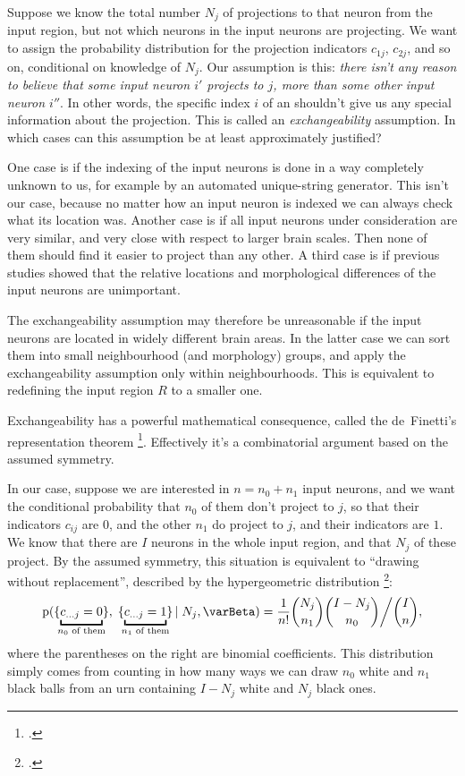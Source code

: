 \documentclass[\ifafour a4paper,12pt,\else a5paper,10pt,\fi%
onecolumn,oneside,article,%
british%
]{memoir}
\theoremstyle{remark}
\theoremstyle{innote}
\newcommand*{\citep}{\footcites}
\newcommand*{\pf}{\mathrm{p}}%
\renewcommand*{\|}[1][]{\nonscript\,#1\vert\nonscript\;\mathopen{}}
\newcommand*{\chap}{ch.}%
\newcommand*{\yI}{\varBeta}
\DeclarePairedDelimiter\tu{\{}{\}}
\begin{document}
Suppose we know the total number $N_{j}$ of projections to that neuron from
the input region, but not which neurons in the input neurons are
projecting. We want to assign the probability distribution for the
projection indicators $c_{1j}$, $c_{2j}$, and so on, conditional on
knowledge of $N_{j}$. Our assumption is this: \emph{there isn't any reason
  to believe that some input neuron $i'$ projects to $j$, more than some
  other input neuron $i''$}. In other words, the specific index $i$ of an
shouldn't give us any special information about the projection. This is
called an \emph{exchangeability} assumption.  In
which cases can this assumption be at least approximately justified?

One case is if the indexing of the input neurons is done in a way
completely unknown to us, for example by an automated unique-string
generator. This isn't our case, because no matter how an input neuron is
indexed we can always check what its location was. Another case is if all
input neurons under consideration are very similar, and very close with
respect to larger brain scales. Then none of them should find it easier to
project than any other. A third case is if previous studies showed that the
relative locations and morphological differences of the input neurons are
unimportant.

The exchangeability assumption may therefore be unreasonable if the input
neurons are located in widely different brain areas. In the latter case we
can sort them into small neighbourhood (and morphology) groups, and apply
the exchangeability assumption only within neighbourhoods. This is
equivalent to redefining the input region $R$ to a smaller one.

Exchangeability has a powerful mathematical consequence, called the
de~Finetti's representation theorem \citep{definetti1930,hewittetal1955}[a
more intuitive explanation is in][]{heathetal1976}[for an informative
review:][]{dawid2013}[the particular form used here is discussed
in][]{diaconis1977,diaconisetal1980}. Effectively it's a combinatorial
argument based on the assumed symmetry.

In our case, suppose we are interested in $n=n_{0}+n_{1}$ input neurons,
and we want the conditional probability that $n_{0}$ of them don't project
to $j$, so that their indicators $c_{ij}$ are $0$, and the other $n_{1}$
do project to $j$, and their indicators are $1$. We know that there are $I$
neurons in the whole input region, and that $N_{j}$ of these project. By
the assumed symmetry, this situation is equivalent to \enquote{drawing
  without replacement}, described by the hypergeometric distribution \citep[\chap~3]{jaynes1994_r2003}:
\begin{equation}
  \label{eq:hyperg_Nj}
  \pf(\tu{\underbracket{c_{\dotso j}=0}_{\mathclap{\text{$n_{0}$ of them}}}},
  \;\tu{\underbracket{c_{\dotso j}=1}_{\mathclap{\text{$n_{1}$ of them}}}} \| N_{j}, \yI)
  =
\frac{1}{n!}  \binom{N_{j}}{n_{1}}\binom{I-N_{j}}{n_{0}}\bigg/ \binom{I}{n},
\end{equation}
where the parentheses on the right are binomial coefficients. This
distribution simply comes from counting in how many ways we can draw
$n_{0}$ white and $n_{1}$ black balls from an urn containing $I-N_{j}$
white and $N_{j}$ black ones.
\end{document}
